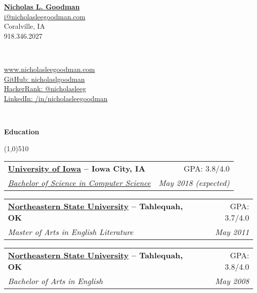 \documentclass[letterpaper,11pt]{article}
\makeatletter
\newcommand{\resheading}[1]{{\large {\begin{minipage}{\textwidth}{\textbf{#1 \vphantom{p\^{E}}}}\end{minipage}}}}
\newcommand{\ressubheading}[4]{
\begin{tabular*}{6.5in}{l@{\extracolsep{\fill}}r}
		\textbf{#1} & #2 \\
		\textit{#3} & \textit{#4} \\
\end{tabular*}\vspace{-6pt}}
\makeatother
\begin{document}
\newcommand{\mywebheader}{

    \begin{center}
	\textbf{\href{http://www.nicholasleegoodman.com/}{\LARGE Nicholas L. Goodman}}\\
		\href{mailto:i@nicholasleegoodman.com}{i@nicholasleegoodman.com}\\
		{Coralville, IA} \\
	{918.346.2027}
	\end{center}
	\\
	\begin{multicols}{2}


	\href{http://www.nicholasleegoodman.com}{www.nicholasleegoodman.com} \\ 
	\href{https://github.com/nicholaslgoodman}{GitHub: nicholaslgoodman} \\
	\href{https://www.hackerrank.com/nicholasleeg}{HackerRank: @nicholasleeg} \\ 
	\href{https://www.linkedin.com/in/nicholasleegoodman}{LinkedIn: /in/nicholasleegoodman} \\
	

		\end{multicols}

\\
\renewcommand{\labelitemi}{$-$}

\vspace{0.1in}}

\mywebheader



\resheading {Education}

\line(1,0){510}

	\begin{description}

		\item
			\ressubheading {
			\href{http://www.truman.edu}{University of Iowa}{ -- Iowa City, IA}}{GPA: 3.8/4.0}
			{\href{http://www.truman.edu/majors-programs/majors-minors/computer-science-major/}{Bachelor of Science in Computer Science}}
			{ \footnotesize{May 2018 (expected)}}
			
		\item
			\ressubheading {
			\href{http://www.nsuok.edu}{Northeastern State University}{ -- Tahlequah, OK}}{GPA: 3.7/4.0}
			{Master of Arts in English Literature}
			{ \footnotesize{May 2011}}
			
		\item
			\ressubheading {
			\href{http://www.nsuok.edu}{Northeastern State University}{ -- Tahlequah, OK}}{GPA: 3.8/4.0}
			{Bachelor of Arts in English}
			{ \footnotesize{May 2008}}

		\end{description} %
\end{document}
